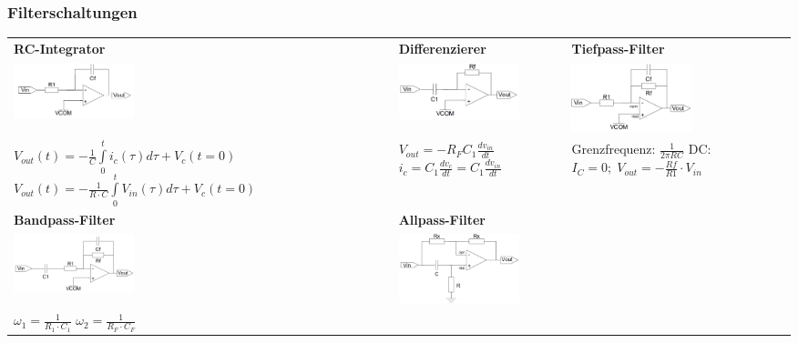 \documentclass[margin=normal]{tex/hsrzf}
\begin{document}
\subsubsection{Filterschaltungen}
\begingroup
\small
\begin{tabularx}{\textwidth}{p{155pt}p{155pt}p{155pt}}
  \textbf{RC-Integrator}                                                                        &
  \textbf{Differenzierer}                                                                       &
  \textbf{Tiefpass-Filter}                                                                        \\
  \includegraphics[width=3.5cm]{img/OpAmp/RC-Integrator.png}                                    &
  \includegraphics[width=3.5cm]{img/OpAmp/Differenzierer.png}                                   &
  \includegraphics[width=3.5cm]{img/OpAmp/TiefpassFilter.png}                                     \\
  $V_{out}(t) = -\frac{1}{C} \int \limits _0 ^t i_c(\tau) d\tau + V_c(t=0)$
  \newline $V_{out}(t) = -\frac{1}{R \cdot C} \int \limits _0 ^t V_{in}(\tau) d\tau + V_c(t=0)$ &
  $V_{out} = -R_FC_1\frac{dv_{in}}{dt}$
  \newline  $i_c = C_1\frac{dv_c}{dt} = C_1\frac{dv_{in}}{dt} $                                 &
  Grenzfrequenz: $\frac{1}{2\pi R C} $
  \newline DC: $I_C = 0; \; V_{out} = -\frac{Rf}{R1}\cdot V_{in}$                                 \\
  \textbf{Bandpass-Filter}                                                                      &
  \textbf{Allpass-Filter}                                                                       &
  \\
  \includegraphics[width=3.5cm]{img/OpAmp/BandPass.png}                                         &
  \includegraphics[width=3.5cm]{img/OpAmp/AllPass.png}                                          &
  \\
  $\omega_1 = \frac{1}{R_1\cdot C_1}$
  $\omega_2 = \frac{1}{R_F \cdot C_F}$
\end{tabularx}
\end{document}
